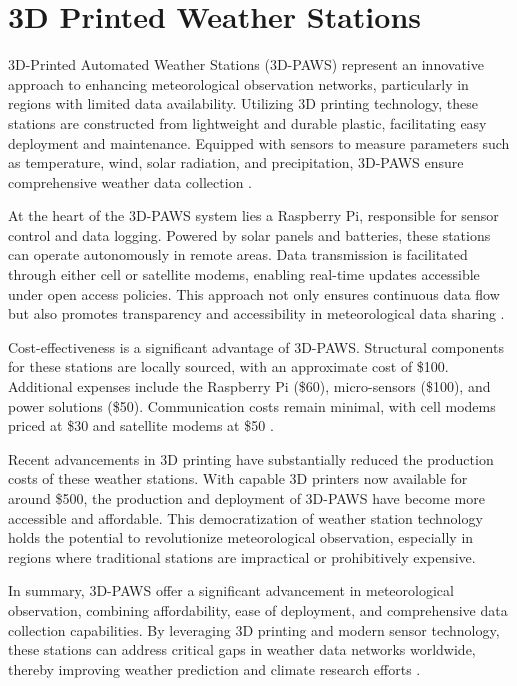 \section{3D Printed Weather Stations}
\label{sec:3d_printed_stations}

3D-Printed Automated Weather Stations (3D-PAWS) represent an innovative approach to enhancing meteorological observation networks, particularly in regions with limited data availability. Utilizing 3D printing technology, these stations are constructed from lightweight and durable plastic, facilitating easy deployment and maintenance. Equipped with sensors to measure parameters such as temperature, wind, solar radiation, and precipitation, 3D-PAWS ensure comprehensive weather data collection \cite{mwangi2017paws}.

At the heart of the 3D-PAWS system lies a Raspberry Pi, responsible for sensor control and data logging. Powered by solar panels and batteries, these stations can operate autonomously in remote areas. Data transmission is facilitated through either cell or satellite modems, enabling real-time updates accessible under open access policies. This approach not only ensures continuous data flow but also promotes transparency and accessibility in meteorological data sharing \cite{mwangi2017paws}.

Cost-effectiveness is a significant advantage of 3D-PAWS. Structural components for these stations are locally sourced, with an approximate cost of \$100. Additional expenses include the Raspberry Pi (\$60), micro-sensors (\$100), and power solutions (\$50). Communication costs remain minimal, with cell modems priced at \$30 and satellite modems at \$50 \cite{mwangi2017paws}.

Recent advancements in 3D printing have substantially reduced the production costs of these weather stations. With capable 3D printers now available for around \$500, the production and deployment of 3D-PAWS have become more accessible and affordable. This democratization of weather station technology holds the potential to revolutionize meteorological observation, especially in regions where traditional stations are impractical or prohibitively expensive.

In summary, 3D-PAWS offer a significant advancement in meteorological observation, combining affordability, ease of deployment, and comprehensive data collection capabilities. By leveraging 3D printing and modern sensor technology, these stations can address critical gaps in weather data networks worldwide, thereby improving weather prediction and climate research efforts \cite{muita2021}.

